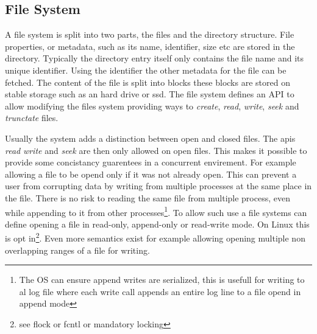 \subsection{File System}
A file system is split into two parts, the files and the directory structure. File properties, or metadata, such as its name, identifier, size etc are stored in the directory. Typically the directory entry itself only contains the file name and its unique identifier. Using the identifier the other metadata for the file can be fetched. The content of the file is split into blocks these blocks are stored on stable storage such as an hard drive or ssd. The file system defines an API to allow modifying the files system providing ways to \textit{create}, \textit{read}, \textit{write}, \textit{seek} and \textit{trunctate} files. 

Usually the system adds a distinction between open and closed files. The apis \textit{read} \textit{write} and \textit{seek} are then only allowed on open files. This makes it possible to provide some concistancy guarentees in a concurrent envirement. For example allowing a file to be opend only if it was not already open. This can prevent a user from corrupting data by writing from multiple processes at the same place in the file. There is no risk to reading the same file from multiple process, even while appending to it from other processes\footnote{The OS can ensure append writes are serialized, this is usefull for writing to al log file where each write call appends an entire log line to a file opend in append mode}. To allow such use a file systems can define opening a file in read-only, append-only or read-write mode. On Linux this is opt in\footnote{see flock or fcntl or mandatory locking}. Even more semantics exist for example allowing opening multiple non overlapping ranges of a file for writing. 

